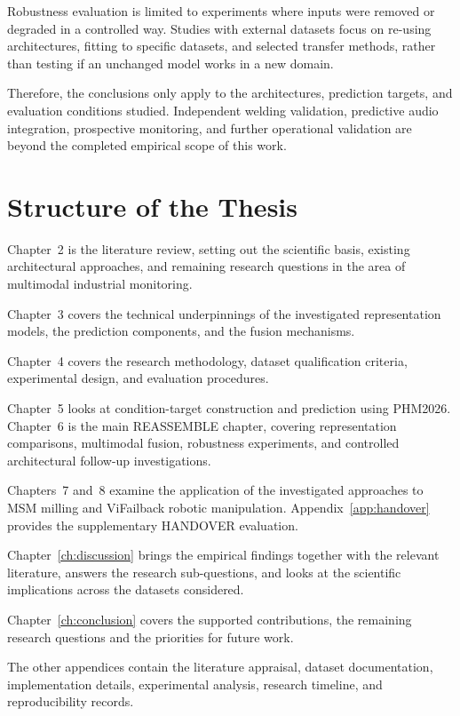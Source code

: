 Robustness evaluation is limited to experiments where inputs
were removed or degraded in a controlled way. Studies with
external datasets focus on re-using architectures, fitting to
specific datasets, and selected transfer methods, rather than
testing if an unchanged model works in a new domain.

Therefore, the conclusions only apply to the architectures,
prediction targets, and evaluation conditions studied. Independent
welding validation, predictive audio integration, prospective
monitoring, and further operational validation are beyond the
completed empirical scope of this work.



\section{Structure of the Thesis}

Chapter~2 is the literature review, setting out the scientific
basis, existing architectural approaches, and remaining research
questions in the area of multimodal industrial monitoring.

Chapter~3 covers the technical underpinnings of the investigated
representation models, the prediction components, and the fusion
mechanisms.

Chapter~4 covers the research methodology, dataset qualification
criteria, experimental design, and evaluation procedures.

Chapter~5 looks at condition-target construction and prediction
using PHM2026. Chapter~6 is the main REASSEMBLE chapter, covering
representation comparisons, multimodal fusion, robustness
experiments, and controlled architectural follow-up investigations.

Chapters~7 and~8 examine the application of the investigated
approaches to MSM milling and ViFailback robotic manipulation.
Appendix~\ref{app:handover} provides the supplementary HANDOVER
evaluation.

Chapter~\ref{ch:discussion} brings the empirical findings together
with the relevant literature, answers the research sub-questions,
and looks at the scientific implications across the datasets
considered.

Chapter~\ref{ch:conclusion} covers the supported contributions,
the remaining research questions and the priorities for future work.

The other appendices contain the literature appraisal, dataset
documentation, implementation details, experimental analysis,
research timeline, and reproducibility records.

